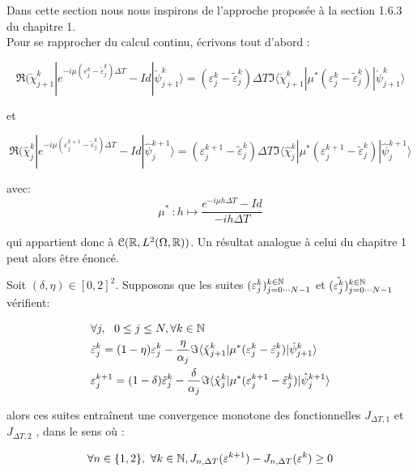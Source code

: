 Dans cette section nous nous inspirons de l’approche proposée à la section 1.6.3 du chapitre 1.
\\Pour se rapprocher du calcul continu, écrivons tout d’abord :

$$ \Re(\check{\chi}^k_{j+1}|e^{-i\mu(\varepsilon^k_j-\tilde{\varepsilon}^k_j)\Delta T}-Id|\check{\psi}^k_{j+1}\rangle = (\varepsilon_j^k - \tilde{\varepsilon}_j^k) \Delta T \Im \langle  \check{\chi}^k_{j+1}|\mu^*(\varepsilon^k_j-\tilde{\varepsilon}^k_j)|\check{\psi}^k_{j+1} \rangle$$

et

$$ \Re(\hat{\chi}^k_{j}|e^{-i\mu(\varepsilon^{k+1}_j-\tilde{\varepsilon}^k_j)\Delta T}-Id|\hat{\psi}^{k+1}_j\rangle = (\varepsilon_j^{k+1} - \tilde{\varepsilon}_j^k) \Delta T \Im \langle  \hat{\chi}^k_{j}|\mu^*(\varepsilon^{k+1}_j-\tilde{\varepsilon}^k_j)|\hat{\psi}^{k+1}_{j} \rangle$$

avec:
\begin{equation}
\mu^*\ :h \mapsto \frac{e^{-i\mu h \Delta T} -Id}{-ih\Delta T}
\end{equation}

qui appartient donc à $\mathcal{C}(\mathbb R, L^2( \Omega, \mathbb R))$. Un résultat analogue à celui du chapitre 1 peut alors être énoncé.

\begin{theorem}
	
	Soit $(\delta,\eta) \in [0,2]^2$. Supposons que les suites 
	$(\varepsilon_j^k)^{k\in\mathbb N}_{j = 0\cdots N-1}$ et $(\tilde{\varepsilon_j^k})^{k\in\mathbb N}_{j = 0\cdots N-1}$ vérifient:
	
	\begin{align}
	&\forall j, \ \ 0\leq j\leq N, \forall k \in \mathbb N \\ \nonumber
	&\tilde{\varepsilon}^k_j = (1-\eta)\varepsilon^k_j - \frac{\eta}{\alpha_j} \Im \langle  \check{\chi}^k_{j+1}|\mu^*(\varepsilon^k_j-\tilde{\varepsilon}^k_j)|\check{\psi}^k_{j+1} \rangle\\
	&\varepsilon^{k+1}_j = (1-\delta)\tilde{\varepsilon}^k_j - \frac{\delta}{\alpha_j} \Im \langle  \hat{\chi}^k_{j}|\mu^*(\varepsilon^{k+1}_j-\tilde{\varepsilon}^k_j)|\hat{\psi}^{k+1}_{j} \rangle \nonumber
	\end{align}
	
	alors ces suites entraînent une convergence monotone des fonctionnelles $J_{\Delta T,1}$ et $J_{\Delta T,2}$ , dans le sens où :
	
	$$ \forall n \in \{1,2\},\  \forall k \in \mathbb N, J_{n,\Delta T}(\varepsilon^{k+1}) - J_{n,\Delta T}(\varepsilon^k)\geq 0 $$
	
\end{theorem}

